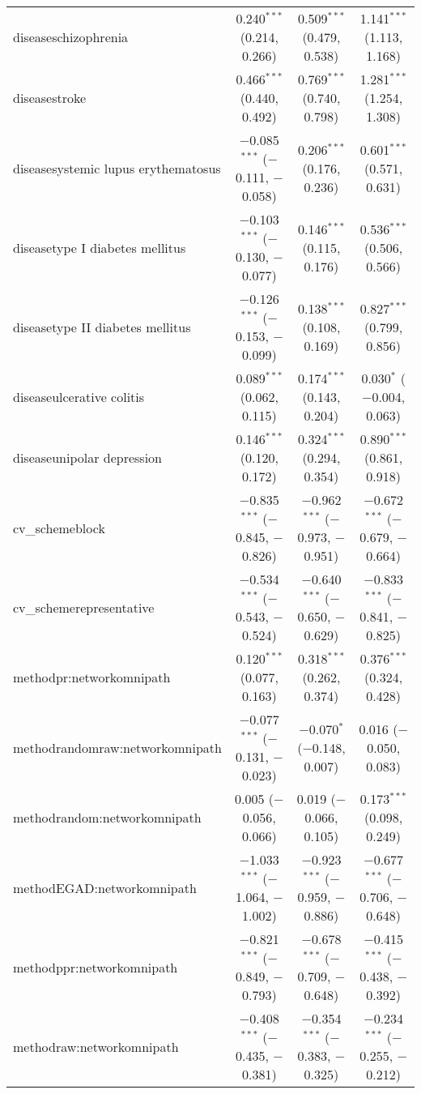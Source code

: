 \begin{table}[!htbp]
\begin{tabular}{@{\extracolsep{5pt}}lccc}
  diseaseschizophrenia & 0.240$^{***}$ (0.214, 0.266) & 0.509$^{***}$ (0.479, 0.538) & 1.141$^{***}$ (1.113, 1.168) \\ 
  diseasestroke & 0.466$^{***}$ (0.440, 0.492) & 0.769$^{***}$ (0.740, 0.798) & 1.281$^{***}$ (1.254, 1.308) \\ 
  diseasesystemic lupus erythematosus & $-$0.085$^{***}$ ($-$0.111, $-$0.058) & 0.206$^{***}$ (0.176, 0.236) & 0.601$^{***}$ (0.571, 0.631) \\ 
  diseasetype I diabetes mellitus & $-$0.103$^{***}$ ($-$0.130, $-$0.077) & 0.146$^{***}$ (0.115, 0.176) & 0.536$^{***}$ (0.506, 0.566) \\ 
  diseasetype II diabetes mellitus & $-$0.126$^{***}$ ($-$0.153, $-$0.099) & 0.138$^{***}$ (0.108, 0.169) & 0.827$^{***}$ (0.799, 0.856) \\ 
  diseaseulcerative colitis & 0.089$^{***}$ (0.062, 0.115) & 0.174$^{***}$ (0.143, 0.204) & 0.030$^{*}$ ($-$0.004, 0.063) \\ 
  diseaseunipolar depression & 0.146$^{***}$ (0.120, 0.172) & 0.324$^{***}$ (0.294, 0.354) & 0.890$^{***}$ (0.861, 0.918) \\ 
  cv\_schemeblock & $-$0.835$^{***}$ ($-$0.845, $-$0.826) & $-$0.962$^{***}$ ($-$0.973, $-$0.951) & $-$0.672$^{***}$ ($-$0.679, $-$0.664) \\ 
  cv\_schemerepresentative & $-$0.534$^{***}$ ($-$0.543, $-$0.524) & $-$0.640$^{***}$ ($-$0.650, $-$0.629) & $-$0.833$^{***}$ ($-$0.841, $-$0.825) \\ 
  methodpr:networkomnipath & 0.120$^{***}$ (0.077, 0.163) & 0.318$^{***}$ (0.262, 0.374) & 0.376$^{***}$ (0.324, 0.428) \\ 
  methodrandomraw:networkomnipath & $-$0.077$^{***}$ ($-$0.131, $-$0.023) & $-$0.070$^{*}$ ($-$0.148, 0.007) & 0.016 ($-$0.050, 0.083) \\ 
  methodrandom:networkomnipath & 0.005 ($-$0.056, 0.066) & 0.019 ($-$0.066, 0.105) & 0.173$^{***}$ (0.098, 0.249) \\ 
  methodEGAD:networkomnipath & $-$1.033$^{***}$ ($-$1.064, $-$1.002) & $-$0.923$^{***}$ ($-$0.959, $-$0.886) & $-$0.677$^{***}$ ($-$0.706, $-$0.648) \\ 
  methodppr:networkomnipath & $-$0.821$^{***}$ ($-$0.849, $-$0.793) & $-$0.678$^{***}$ ($-$0.709, $-$0.648) & $-$0.415$^{***}$ ($-$0.438, $-$0.392) \\ 
  methodraw:networkomnipath & $-$0.408$^{***}$ ($-$0.435, $-$0.381) & $-$0.354$^{***}$ ($-$0.383, $-$0.325) & $-$0.234$^{***}$ ($-$0.255, $-$0.212) \\ 

\end{tabular}
\end{table}
